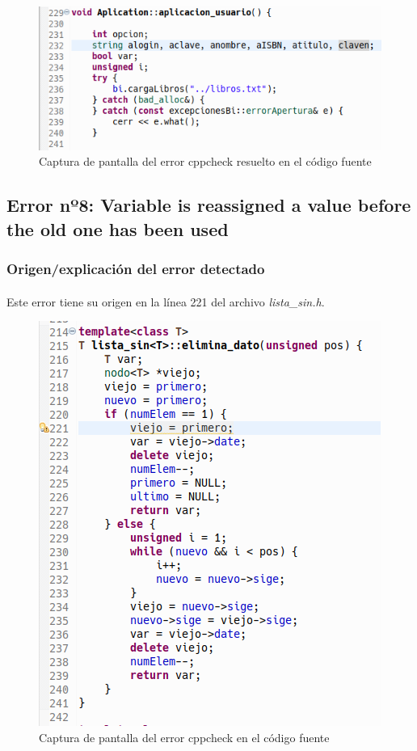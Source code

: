 		\begin{figure}[H]
			\centering
			\includegraphics[scale=0.55]{img/captura84.png}
			\caption{Captura de pantalla del error cppcheck resuelto en el código fuente}
			\label{captura84}
		\end{figure}
	
	\subsection{Error nº8: Variable is reassigned a value before the old one has been used}
	
	\subsubsection{Origen/explicación del error detectado}
	
		\paragraph{}Este error tiene su origen en la línea 221 del archivo \textit{lista\_sin.h}.
	
		\begin{figure}[H]
			\centering
			\includegraphics[scale=0.55]{img/captura86.png}
			\caption{Captura de pantalla del error cppcheck en el código fuente}
			\label{captura86}
		\end{figure}
	
